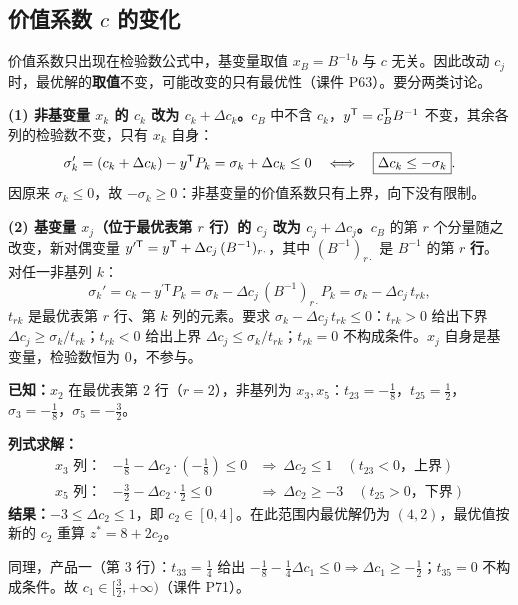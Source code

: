 \subsection{价值系数 $c$ 的变化}

价值系数只出现在检验数公式中，基变量取值 $x_B=B^{-1}b$ 与 $c$ 无关。因此改动 $c_j$ 时，最优解的\textbf{取值}不变，可能改变的只有最优性（课件 P63）。要分两类讨论。

\begin{proofbox}[推导 \srcTag{课件 P64--P67}]
\textbf{(1) 非基变量 $x_k$ 的 $c_k$ 改为 $c_k+\Delta c_k$。}$c_B$ 中不含 $c_k$，$y^{\mathsf T}=c_B^{\mathsf T} B^{-1}$ 不变，其余各列的检验数不变，只有 $x_k$ 自身：
\[
\sigma_k'=(c_k+\Delta c_k)-y^{\mathsf T} P_k=\sigma_k+\Delta c_k\le0\quad\Longleftrightarrow\quad\boxed{\Delta c_k\le-\sigma_k}.
\]
因原来 $\sigma_k\le0$，故 $-\sigma_k\ge0$：非基变量的价值系数只有上界，向下没有限制。\par
\textbf{(2) 基变量 $x_j$（位于最优表第 $r$ 行）的 $c_j$ 改为 $c_j+\Delta c_j$。}$c_B$ 的第 $r$ 个分量随之改变，新对偶变量 $y^{\prime\mathsf T}=y^{\mathsf T}+\Delta c_j\,(B^{-1})_{r\cdot}$，其中 $(B^{-1})_{r\cdot}$ 是 $B^{-1}$ 的第 $r$ \textbf{行}。对任一非基列 $k$：
\[
\sigma_k'=c_k-y^{\prime\mathsf T} P_k=\sigma_k-\Delta c_j\,(B^{-1})_{r\cdot}P_k=\sigma_k-\Delta c_j\,t_{rk},
\]
$t_{rk}$ 是最优表第 $r$ 行、第 $k$ 列的元素。要求 $\sigma_k-\Delta c_j\,t_{rk}\le0$：$t_{rk}>0$ 给出下界 $\Delta c_j\ge\sigma_k/t_{rk}$；$t_{rk}<0$ 给出上界 $\Delta c_j\le\sigma_k/t_{rk}$；$t_{rk}=0$ 不构成条件。$x_j$ 自身是基变量，检验数恒为 0，不参与。
\end{proofbox}

\begin{examplebox}
\textbf{已知：}$x_2$ 在最优表第 2 行（$r=2$），非基列为 $x_3,x_5$：$t_{23}=-\frac18$，$t_{25}=\frac12$，$\sigma_3=-\frac18$，$\sigma_5=-\frac32$。\par
\textbf{列式求解：}
\[
\begin{array}{lll}
x_3\text{ 列：} & -\frac18-\Delta c_2\cdot(-\frac18)\le0 & \Rightarrow\ \Delta c_2\le1\quad(t_{23}<0\text{，上界})\\[2pt]
x_5\text{ 列：} & -\frac32-\Delta c_2\cdot\frac12\le0 & \Rightarrow\ \Delta c_2\ge-3\quad(t_{25}>0\text{，下界})
\end{array}
\]
\textbf{结果：}$-3\le\Delta c_2\le1$，即 $c_2\in[0,4]$。在此范围内最优解仍为 $(4,2)$，最优值按新的 $c_2$ 重算 $z^*=8+2c_2$。\par
同理，产品一（第 3 行）：$t_{33}=\frac14$ 给出 $-\frac18-\frac14\Delta c_1\le0\Rightarrow\Delta c_1\ge-\frac12$；$t_{35}=0$ 不构成条件。故 $c_1\in[\frac32,+\infty)$（课件 P71）。
\end{examplebox}

